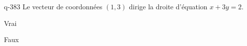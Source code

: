\begin{truefalse}{q-383}
Le vecteur de coordonnées $(1,3)$ dirige la droite d'équation $x+3y=2$.
\item Vrai
\item* Faux
\end{truefalse}


